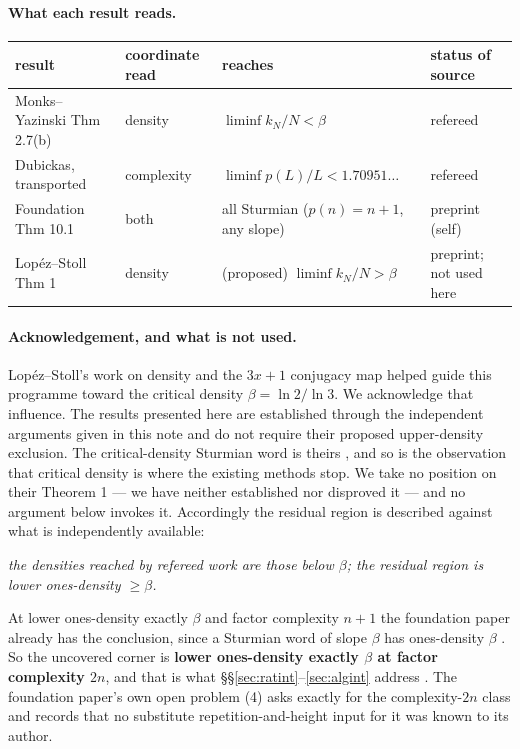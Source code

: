 \documentclass[11pt]{article}
\begin{document}
\paragraph{What each result reads.}
\begin{center}
\begin{tabular}{@{}llll@{}}
\toprule
result & coordinate read & reaches & status of source \\
\midrule
Monks--Yazinski Thm 2.7(b) \cite{MonksYazinski2004} & density & $\liminf k_N/N<\beta$ & refereed \\
Dubickas, transported \cite{Dubickas2009,DeJesus2026Sturmian} & complexity & $\liminf p(L)/L<1.70951\ldots$ & refereed \\
Foundation Thm 10.1 \cite{DeJesus2026Sturmian} & both & all Sturmian ($p(n)=n+1$, any slope) & preprint (self) \\
Lop\'ez--Stoll Thm 1 \cite{LopezStoll2021} & density & (proposed) $\liminf k_N/N>\beta$ & preprint; not used here \\
\bottomrule
\end{tabular}
\end{center}

\paragraph{Acknowledgement, and what is not used.}
Lop\'ez--Stoll's work on density and the $3x+1$ conjugacy map helped guide this programme toward the
critical density $\beta=\ln2/\ln3$. We acknowledge that influence. The results presented here are
established through the independent arguments given in this note and do not require their proposed
upper-density exclusion. The critical-density Sturmian word is theirs \cite{LopezStoll2009}, and so
is the observation that critical density is where the existing methods stop. We take no position on
their Theorem 1 \cite{LopezStoll2021} --- we have neither established nor disproved it --- and no
argument below invokes it. Accordingly the residual region is described against what is
independently available:

\begin{center}
\emph{the densities reached by refereed work are those below $\beta$; the residual region is
lower ones-density $\ge\beta$.}
\end{center}

At lower ones-density exactly $\beta$ and factor complexity $n+1$ the foundation paper already has
the conclusion, since a Sturmian word of slope $\beta$ has ones-density $\beta$
\cite{DeJesus2026Sturmian}. So the uncovered corner is \textbf{lower ones-density exactly $\beta$ at
factor complexity $2n$}, and that is what \S\S\ref{sec:ratint}--\ref{sec:algint} address \cite{Phase10Density}. The
foundation paper's own open problem (4) asks exactly for the complexity-$2n$ class and records that
no substitute repetition-and-height input for it was known to its author.
\end{document}
